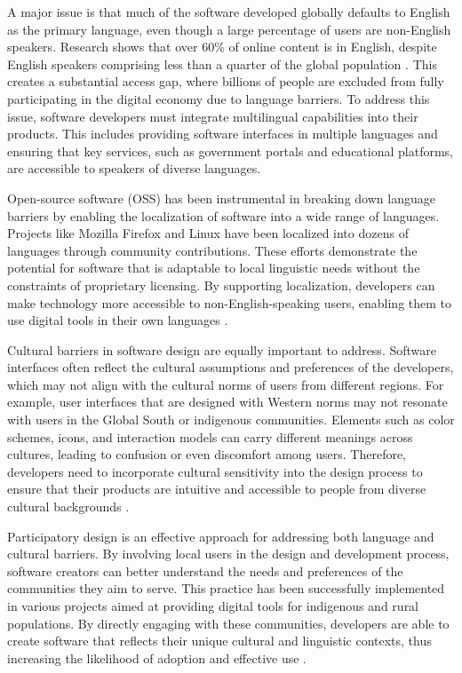 \begin{refsection}
A major issue is that much of the software developed globally defaults to English as the primary language, even though a large percentage of users are non-English speakers. Research shows that over 60\% of online content is in English, despite English speakers comprising less than a quarter of the global population \cite[pp.~120-123]{fuchscriticalcommunication}. This creates a substantial access gap, where billions of people are excluded from fully participating in the digital economy due to language barriers. To address this issue, software developers must integrate multilingual capabilities into their products. This includes providing software interfaces in multiple languages and ensuring that key services, such as government portals and educational platforms, are accessible to speakers of diverse languages.

Open-source software (OSS) has been instrumental in breaking down language barriers by enabling the localization of software into a wide range of languages. Projects like Mozilla Firefox and Linux have been localized into dozens of languages through community contributions. These efforts demonstrate the potential for software that is adaptable to local linguistic needs without the constraints of proprietary licensing. By supporting localization, developers can make technology more accessible to non-English-speaking users, enabling them to use digital tools in their own languages \cite[pp.~45-48]{stallman2010freesoftware}.

Cultural barriers in software design are equally important to address. Software interfaces often reflect the cultural assumptions and preferences of the developers, which may not align with the cultural norms of users from different regions. For example, user interfaces that are designed with Western norms may not resonate with users in the Global South or indigenous communities. Elements such as color schemes, icons, and interaction models can carry different meanings across cultures, leading to confusion or even discomfort among users. Therefore, developers need to incorporate cultural sensitivity into the design process to ensure that their products are intuitive and accessible to people from diverse cultural backgrounds \cite[pp.~45-48]{fuchs2016digital}. 

Participatory design is an effective approach for addressing both language and cultural barriers. By involving local users in the design and development process, software creators can better understand the needs and preferences of the communities they aim to serve. This practice has been successfully implemented in various projects aimed at providing digital tools for indigenous and rural populations. By directly engaging with these communities, developers are able to create software that reflects their unique cultural and linguistic contexts, thus increasing the likelihood of adoption and effective use \cite[pp.~75-78]{eubanksautomating}.


\end{refsection}
